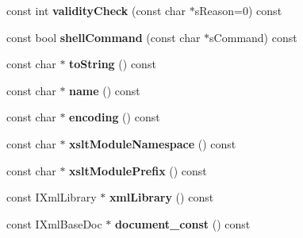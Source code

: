\begin{DoxyCompactItemize}
\item 
\hypertarget{classgeneral__server_1_1Database_ae4a83f6fd7bd22f9069e65cc9b7c5db1}{const int {\bfseries validity\-Check} (const char $\ast$s\-Reason=0) const }\label{classgeneral__server_1_1Database_ae4a83f6fd7bd22f9069e65cc9b7c5db1}

\item 
\hypertarget{classgeneral__server_1_1Database_abafc3ee983a2e1205ca376fa3c740b8d}{const bool {\bfseries shell\-Command} (const char $\ast$s\-Command) const }\label{classgeneral__server_1_1Database_abafc3ee983a2e1205ca376fa3c740b8d}

\item 
\hypertarget{classgeneral__server_1_1Database_a8e2c1e3818706d408a57d00a32518143}{const char $\ast$ {\bfseries to\-String} () const }\label{classgeneral__server_1_1Database_a8e2c1e3818706d408a57d00a32518143}

\item 
\hypertarget{classgeneral__server_1_1Database_ac440cbc2adfcd55eb6882113e374999a}{const char $\ast$ {\bfseries name} () const }\label{classgeneral__server_1_1Database_ac440cbc2adfcd55eb6882113e374999a}

\item 
\hypertarget{classgeneral__server_1_1Database_acaae32eec4b03d559960ffc1d612f384}{const char $\ast$ {\bfseries encoding} () const }\label{classgeneral__server_1_1Database_acaae32eec4b03d559960ffc1d612f384}

\item 
\hypertarget{classgeneral__server_1_1Database_aa087706117479d2188c7b57fc25d829a}{const char $\ast$ {\bfseries xslt\-Module\-Namespace} () const }\label{classgeneral__server_1_1Database_aa087706117479d2188c7b57fc25d829a}

\item 
\hypertarget{classgeneral__server_1_1Database_a6a8b2d457258a900dc4c4f04abc1f860}{const char $\ast$ {\bfseries xslt\-Module\-Prefix} () const }\label{classgeneral__server_1_1Database_a6a8b2d457258a900dc4c4f04abc1f860}

\item 
\hypertarget{classgeneral__server_1_1Database_a3689984a168f2459dfea491fc42af124}{const \-I\-Xml\-Library $\ast$ {\bfseries xml\-Library} () const }\label{classgeneral__server_1_1Database_a3689984a168f2459dfea491fc42af124}

\item 
\hypertarget{classgeneral__server_1_1Database_a7af0fa0a4edd6868aec11015b3511959}{const \-I\-Xml\-Base\-Doc $\ast$ {\bfseries document\-\_\-const} () const }\label{classgeneral__server_1_1Database_a7af0fa0a4edd6868aec11015b3511959}


\end{DoxyCompactItemize}

